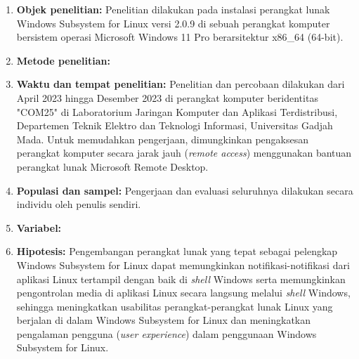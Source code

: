 \begin{enumerate}
    \item \textbf{Objek penelitian:} Penelitian dilakukan pada instalasi perangkat lunak Windows Subsystem for Linux versi 2.0.9 di sebuah perangkat komputer bersistem operasi Microsoft Windows 11 Pro berarsitektur x86\_64 (64-bit).
    
    \item \textbf{Metode penelitian:} 
    
    \item \textbf{Waktu dan tempat penelitian:} Penelitian dan percobaan dilakukan dari April 2023 hingga Desember 2023 di perangkat komputer beridentitas "COM25" di Laboratorium Jaringan Komputer dan Aplikasi Terdistribusi, Departemen Teknik Elektro dan Teknologi Informasi, Universitas Gadjah Mada. Untuk memudahkan pengerjaan, dimungkinkan pengaksesan perangkat komputer secara jarak jauh (\textit{remote access}) menggunakan bantuan perangkat lunak Microsoft Remote Desktop.
    
    \item \textbf{Populasi dan sampel:} Pengerjaan dan evaluasi seluruhnya dilakukan secara individu oleh penulis sendiri.
    
    \item \textbf{Variabel:} 
    
    \item \textbf{Hipotesis:} Pengembangan perangkat lunak yang tepat sebagai pelengkap Windows Subsystem for Linux dapat memungkinkan notifikasi-notifikasi dari aplikasi Linux tertampil dengan baik di \textit{shell} Windows serta memungkinkan pengontrolan media di aplikasi Linux secara langsung melalui \textit{shell} Windows, sehingga meningkatkan usabilitas perangkat-perangkat lunak Linux yang berjalan di dalam Windows Subsystem for Linux dan meningkatkan pengalaman pengguna (\textit{user experience}) dalam penggunaan Windows Subsystem for Linux.

    

\end{enumerate}
